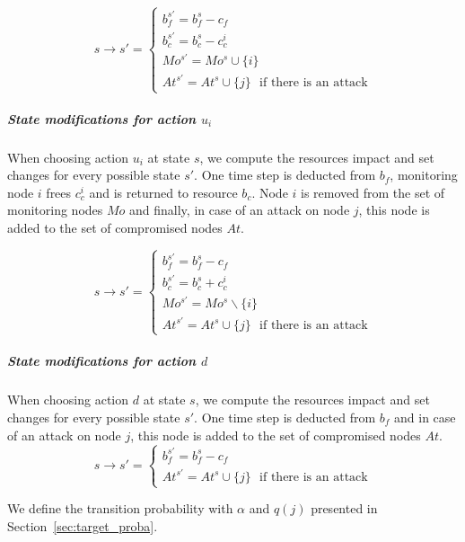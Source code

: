 \begin{equation}
  s \longrightarrow s' =\begin{cases}
    b_f^{s'} = b_f^s - c_f\\
    b_c^{s'} = b_c^s - c_c^i\\
    Mo^{s'} = Mo^s \cup \{i\}\\
    At^{s'} = At^s \cup \{j\} \text{~~if there is an attack}
  \end{cases}
\end{equation}

\subparagraph*{\textbf{State modifications for action $u_i$}}
When choosing action $u_i$ at state $s$, we compute the resources impact and set changes for every possible state $s'$. One time step is deducted from $b_f$, monitoring node $i$ frees $c_c^i$ and is returned to resource $b_c$. Node $i$ is removed from the set of monitoring nodes $Mo$ and finally, in case of an attack on node $j$, this node is added to the set of compromised nodes $At$.

\begin{equation}
  s \longrightarrow s' =\begin{cases}
    b_f^{s'} = b_f^s - c_f\\
    b_c^{s'} = b_c^s + c_c^i\\
    Mo^{s'} = Mo^s \backslash\{i\}\\
    At^{s'} = At^s \cup \{j\}\text{~~if there is an attack}
  \end{cases}
\end{equation}

\subparagraph*{\textbf{State modifications for action $d$}}
When choosing action $d$ at state $s$, we compute the resources impact and set changes for every possible state $s'$. One time step is deducted from $b_f$ and in case of an attack on node $j$, this node is added to the set of compromised nodes $At$.
\begin{equation}
  s \longrightarrow s' =\begin{cases}
    b_f^{s'} = b_f^s - c_f\\
    At^{s'} = At^s \cup \{j\}\text{~~if there is an attack}
  \end{cases}
\end{equation}


We define the transition probability with $\alpha$ and $q(j)$ presented in Section~\ref{sec:target_proba}.

